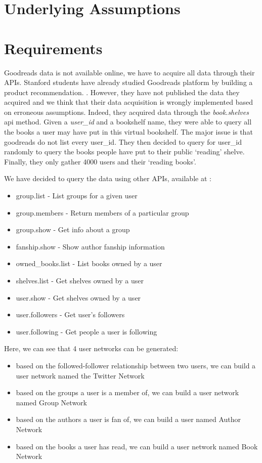 \documentclass[11pt]{article}
\begin{document}
\section{Underlying Assumptions}
\section{Requirements}

Goodreads data is not available online, we have to acquire all data through their APIs. Stanford students have already studied Goodreads platform by building a product recommendation. \cite{stanford:goodreads}. However, they have not published the data they acquired and we think that their data acquisition is wrongly implemented based on erroneous assumptions. Indeed, they acquired data through the \textit{book.shelves} api method. Given a \textit{user_id} and a bookshelf name, they were able to query all the books a user may have put in this virtual bookshelf. The major issue is that goodreads do not list every user_id. They then decided to query for user_id randomly to query the books people have put to their public `reading' shelve. Finally, they only gather 4000 users and their `reading books'.

We have decided to query the data using other APIs, available at \cite{goodreads:api}:
\begin{itemize}
\item group.list - List groups for a given user
\item group.members - Return members of a particular group
\item group.show - Get info about a group
\item fanship.show - Show author fanship information
\item owned_books.list - List books owned by a user
\item shelves.list - Get shelves owned by a user
\item user.show - Get shelves owned by a user
\item user.followers - Get user's followers
\item user.following - Get people a user is following
\end{itemize}

Here, we can see that 4 user networks can be generated:
\begin{itemize}
\item based on the followed-follower relationship between two users, we can build a user network named the Twitter Network
\item based on the groups a user is a member of, we can build a user network named Group Network
\item based on the authors a user is fan of, we can build a user named Author Network
\item based on the books a user has read, we can build a user network named Book Network
\end{itemize}
\end{document}
